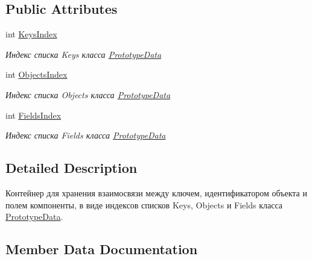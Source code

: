 \subsection*{Public Attributes}
\begin{DoxyCompactItemize}
\item 
int \hyperlink{struct_hattori_game2_1_1_prototyping_1_1_prototype_relation_a27933617bc39d11099af269e754f0411_a27933617bc39d11099af269e754f0411}{Keys\+Index}
\begin{DoxyCompactList}\small\item\em Индекс списка {\ttfamily Keys} класса \hyperlink{class_hattori_game2_1_1_prototyping_1_1_prototype_data}{Prototype\+Data} \end{DoxyCompactList}\item 
int \hyperlink{struct_hattori_game2_1_1_prototyping_1_1_prototype_relation_a7f0eab82b565c07fe25369f2257da5e7_a7f0eab82b565c07fe25369f2257da5e7}{Objects\+Index}
\begin{DoxyCompactList}\small\item\em Индекс списка {\ttfamily Objects} класса \hyperlink{class_hattori_game2_1_1_prototyping_1_1_prototype_data}{Prototype\+Data} \end{DoxyCompactList}\item 
int \hyperlink{struct_hattori_game2_1_1_prototyping_1_1_prototype_relation_a88f609574124005e5fc15ce6f1e370d7_a88f609574124005e5fc15ce6f1e370d7}{Fields\+Index}
\begin{DoxyCompactList}\small\item\em Индекс списка {\ttfamily Fields} класса \hyperlink{class_hattori_game2_1_1_prototyping_1_1_prototype_data}{Prototype\+Data} \end{DoxyCompactList}\end{DoxyCompactItemize}


\subsection{Detailed Description}
Контейнер для хранения взаимосвязи между ключем, идентификатором объекта и полем компоненты, в виде индексов списков {\ttfamily Keys}, {\ttfamily Objects} и {\ttfamily Fields} класса \hyperlink{class_hattori_game2_1_1_prototyping_1_1_prototype_data}{Prototype\+Data}. 



\subsection{Member Data Documentation}
\hypertarget{struct_hattori_game2_1_1_prototyping_1_1_prototype_relation_a88f609574124005e5fc15ce6f1e370d7_a88f609574124005e5fc15ce6f1e370d7}{}
